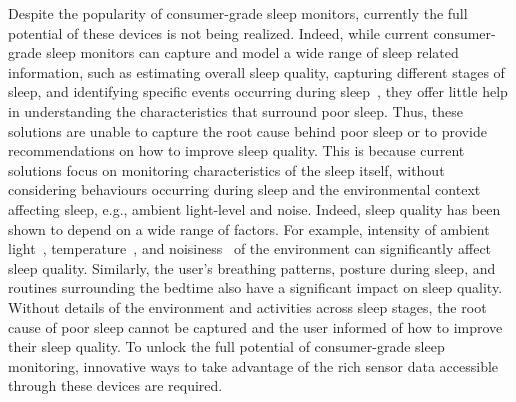 Despite the popularity of consumer-grade sleep monitors, currently the full potential of these devices is not being realized. Indeed, while
current consumer-grade sleep monitors can capture and model a wide range of sleep related information, such as estimating overall sleep
quality, capturing different stages of sleep, and identifying specific events occurring during
sleep~\cite{kay2012lullaby,zhang2013real,sleepmonitor}, they offer little help in understanding the characteristics that surround poor
sleep. Thus, these solutions are unable to capture the root cause behind poor sleep or to provide recommendations on how to improve sleep
quality. This is because current solutions focus on monitoring characteristics of the sleep itself, without considering behaviours
occurring during sleep and the environmental context affecting sleep, e.g., ambient light-level and noise. Indeed, sleep quality has been
shown to depend on a wide range of factors. For example, intensity of ambient light~\cite{hood04determinants},
temperature~\cite{urponen88self}, and noisiness~\cite{muzet2007environmental} of the environment can significantly affect sleep quality.
Similarly, the user's breathing patterns, posture during sleep, and routines surrounding the bedtime also have a significant impact on
sleep quality. Without details of the environment and activities across sleep stages, the root cause of poor sleep cannot be captured and
the user informed of how to improve their sleep quality. To unlock the full potential of consumer-grade sleep monitoring, innovative ways
to take advantage of the rich sensor data accessible through these devices are required.








